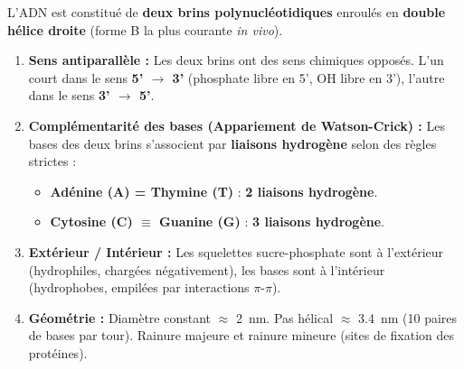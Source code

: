 \documentclass[11pt]{article}
\begin{document}
\begin{propriete}
L'ADN est constitué de \textbf{deux brins polynucléotidiques} enroulés en \textbf{double hélice droite} (forme B la plus courante \textit{in vivo}).
\begin{enumerate}
    \item \textbf{Sens antiparallèle :} Les deux brins ont des sens chimiques opposés. L'un court dans le sens \textbf{5' $\rightarrow$ 3'} (phosphate libre en 5', OH libre en 3'), l'autre dans le sens \textbf{3' $\rightarrow$ 5'}.
    \item \textbf{Complémentarité des bases (Appariement de Watson-Crick) :} Les bases des deux brins s'associent par \textbf{liaisons hydrogène} selon des règles strictes :
    \begin{itemize}
        \item \textbf{Adénine (A) = Thymine (T)} : \textbf{2 liaisons hydrogène}.
        \item \textbf{Cytosine (C) $\equiv$ Guanine (G)} : \textbf{3 liaisons hydrogène}.
    \end{itemize}
    \item \textbf{Extérieur / Intérieur :} Les squelettes sucre-phosphate sont à l'extérieur (hydrophiles, chargées négativement), les bases sont à l'intérieur (hydrophobes, empilées par interactions $\pi$-$\pi$).
    \item \textbf{Géométrie :} Diamètre constant $\approx$ \SI{2}{nm}. Pas hélical $\approx$ \SI{3,4}{nm} (10 paires de bases par tour). Rainure majeure et rainure mineure (sites de fixation des protéines).
\end{enumerate}
\end{propriete}
\end{document}
